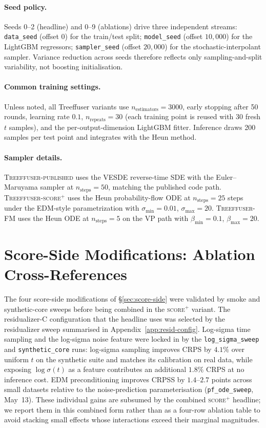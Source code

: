 \documentclass{uai2026}
\begin{document}
\paragraph{Seed policy.} Seeds 0--2 (headline) and 0--9 (ablations) drive three independent streams: \texttt{data\_seed} (offset 0) for the train/test split; \texttt{model\_seed} (offset $10{,}000$) for the LightGBM regressors; \texttt{sampler\_seed} (offset $20{,}000$) for the stochastic-interpolant sampler. Variance reduction across seeds therefore reflects only sampling-and-split variability, not boosting initialisation.

\paragraph{Common training settings.} Unless noted, all Treeffuser variants use $n_{\text{estimators}}=3000$, early stopping after 50 rounds, learning rate $0.1$, $n_{\text{repeats}}=30$ (each training point is reused with 30 fresh $t$ samples), and the per-output-dimension LightGBM fitter. Inference draws 200 samples per test point and integrates with the Heun method.

\paragraph{Sampler details.}
\textsc{Treeffuser-published} uses the VESDE reverse-time SDE with the Euler--Maruyama sampler at $n_{\text{steps}}=50$, matching the published code path. \textsc{Treeffuser-score$^+$} uses the Heun probability-flow ODE at $n_{\text{steps}}=25$ steps under the EDM-style parametrization with $\sigma_{\min}=0.01$, $\sigma_{\max}=20$. \textsc{Treeffuser-FM} uses the Heun ODE at $n_{\text{steps}}=5$ on the VP path with $\beta_{\min}=0.1$, $\beta_{\max}=20$.

\section{Score-Side Modifications: Ablation Cross-References}\label{app:score-side}

The four score-side modifications of \S\ref{sec:score-side} were validated by smoke and synthetic-core sweeps before being combined in the \textsc{score$^+$} variant.
The residualizer-C configuration that the headline uses was selected by the residualizer sweep summarised in Appendix~\ref{app:resid-config}. Log-sigma time sampling and the log-sigma noise feature were locked in by the \texttt{log\_sigma\_sweep} and \texttt{synthetic\_core} runs: log-sigma sampling improves CRPS by $4.1\%$ over uniform $t$ on the synthetic suite and matches its calibration on real data, while exposing $\log\sigma(t)$ as a feature contributes an additional $1.8\%$ CRPS at no inference cost. EDM preconditioning improves CRPSS by $1.4$--$2.7$ points across small datasets relative to the noise-prediction parameterisation (\texttt{pf\_ode\_sweep}, May~13). These individual gains are subsumed by the combined \textsc{score$^+$} headline; we report them in this combined form rather than as a four-row ablation table to avoid stacking small effects whose interactions exceed their marginal magnitudes.
\end{document}
